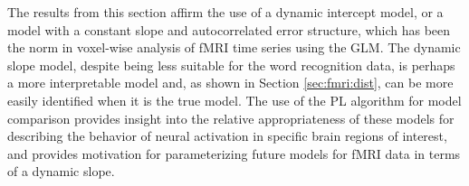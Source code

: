 The results from this section affirm the use of a dynamic intercept model, or a model with a constant slope and autocorrelated error structure, which has been the norm in voxel-wise analysis of fMRI time series using the GLM. The dynamic slope model, despite being less suitable for the word recognition data, is perhaps a more interpretable model and, as shown in Section \ref{sec:fmri:dist}, can be more easily identified when it is the true model. The use of the PL algorithm for model comparison provides insight into the relative appropriateness of these models for describing the behavior of neural activation in specific brain regions of interest, and provides motivation for parameterizing future models for fMRI data in terms of a dynamic slope. 